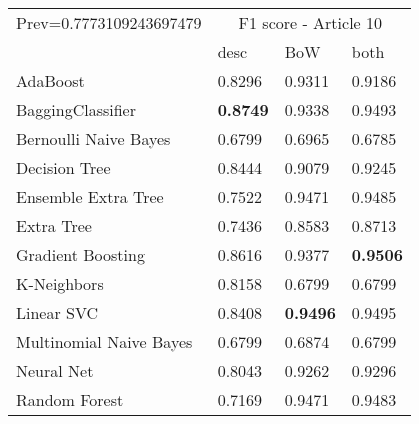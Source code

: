 \begin{tabular}{|l|l|l|l| }
\hline
Prev=0.7773109243697479 &  \multicolumn{3}{c|}{F1 score - Article 10} \\
\cline{2-4} & desc & BoW & both \\ \hline
AdaBoost                & 0.8296 & 0.9311 & 0.9186\\
BaggingClassifier       & {\bf 0.8749} & 0.9338 & 0.9493\\
Bernoulli Naive Bayes   & 0.6799 & 0.6965 & 0.6785\\
Decision Tree           & 0.8444 & 0.9079 & 0.9245\\
Ensemble Extra Tree     & 0.7522 & 0.9471 & 0.9485\\
Extra Tree              & 0.7436 & 0.8583 & 0.8713\\
Gradient Boosting       & 0.8616 & 0.9377 & {\bf 0.9506}\\
K-Neighbors             & 0.8158 & 0.6799 & 0.6799\\
Linear SVC              & 0.8408 & {\bf 0.9496} & 0.9495\\
Multinomial Naive Bayes & 0.6799 & 0.6874 & 0.6799\\
Neural Net              & 0.8043 & 0.9262 & 0.9296\\
Random Forest           & 0.7169 & 0.9471 & 0.9483\\
\hline
\end{tabular}